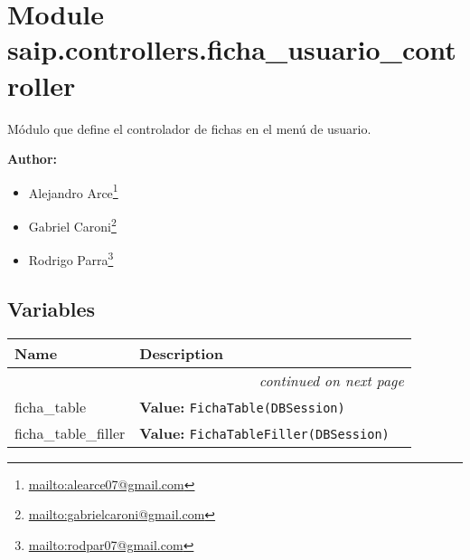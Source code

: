 %
%
%


\section{Module saip.controllers.ficha\_usuario\_controller}

    \label{saip:controllers:ficha_usuario_controller}
Módulo que define el controlador de fichas en el menú de usuario.

\textbf{Author:} \begin{itemize}
\setlength{\parskip}{0.6ex}
  \item Alejandro 
    Arce\footnote{\href{mailto:alearce07@gmail.com}{mailto:alearce07@gmail.com}}

  \item Gabriel 
    Caroni\footnote{\href{mailto:gabrielcaroni@gmail.com}{mailto:gabrielcaroni@gmail.com}}

  \item Rodrigo 
    Parra\footnote{\href{mailto:rodpar07@gmail.com}{mailto:rodpar07@gmail.com}}

\end{itemize}





  \subsection{Variables}

    \vspace{-1cm}
\hspace{\varindent}\begin{longtable}{|p{\varnamewidth}|p{\vardescrwidth}|l}
\cline{1-2}
\cline{1-2} \centering \textbf{Name} & \centering \textbf{Description}& \\
\cline{1-2}
\endhead\cline{1-2}\multicolumn{3}{r}{\small\textit{continued on next page}}\\\endfoot\cline{1-2}
\endlastfoot\raggedright f\-i\-c\-h\-a\-\_\-t\-a\-b\-l\-e\- & \raggedright \textbf{Value:} 
{\tt FichaTable(DBSession)}&\\
\cline{1-2}
\raggedright f\-i\-c\-h\-a\-\_\-t\-a\-b\-l\-e\-\_\-f\-i\-l\-l\-e\-r\- & \raggedright \textbf{Value:} 
{\tt FichaTableFiller(DBSession)}&\\
\cline{1-2}
\end{longtable}


